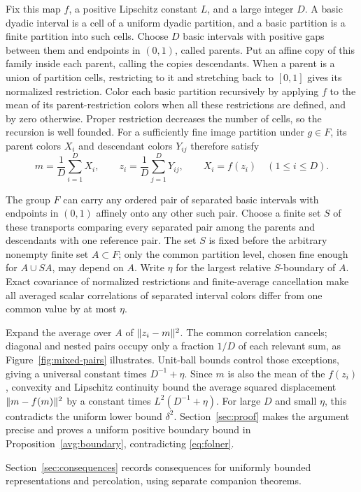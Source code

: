 Fix this map \(f\), a positive Lipschitz constant \(L\), and a large
integer \(D\). A basic dyadic interval is a cell of a uniform dyadic
partition, and a basic partition is a finite partition into such cells.
Choose \(D\) basic intervals with positive gaps between them and endpoints
in \((0,1)\), called parents. Put an affine copy of this family inside
each parent, calling the copies descendants. When a parent is a union
of partition cells, restricting to it and stretching back to \([0,1]\)
gives its normalized restriction. Color each basic partition recursively
by applying \(f\) to the mean of its parent-restriction colors when all
these restrictions are defined, and by zero otherwise. Proper
restriction decreases the number of cells, so the recursion is well
founded. For a sufficiently fine image partition under \(g\in F\), its
parent colors \(X_i\) and descendant colors \(Y_{ij}\) therefore satisfy
\[
 m=\frac1D\sum_{i=1}^D X_i,\qquad
 z_i=\frac1D\sum_{j=1}^D Y_{ij},\qquad
 X_i=f(z_i)\quad(1\le i\le D).
\]

The group \(F\) can carry any ordered pair of separated basic intervals
with endpoints in \((0,1)\) affinely onto any other such pair. Choose a
finite set \(S\) of these transports comparing every separated pair among
the parents and descendants with one reference pair. The set \(S\) is
fixed before the arbitrary nonempty
finite set \(A\subset F\); only the common partition level, chosen fine
enough for \(A\cup SA\), may depend on \(A\). Write \(\eta\) for the
largest relative \(S\)-boundary of \(A\). Exact covariance of normalized
restrictions and finite-average cancellation make all averaged scalar
correlations of separated interval colors differ from one common value
by at most \(\eta\).

Expand the average over \(A\) of \(\lVert z_i-m\rVert^2\). The common
correlation cancels; diagonal and nested pairs occupy only a fraction
\(1/D\) of each relevant sum, as Figure~\ref{fig:mixed-pairs} illustrates.
Unit-ball bounds control those exceptions, giving a universal constant
times \(D^{-1}+\eta\). Since \(m\) is also the mean of the \(f(z_i)\),
convexity and Lipschitz continuity bound the average squared displacement
\(\lVert m-f(m)\rVert^2\) by a constant times \(L^2(D^{-1}+\eta)\).
For large \(D\) and small \(\eta\), this contradicts the uniform lower
bound \(\delta^2\). Section~\ref{sec:proof} makes the argument precise and proves a
uniform positive boundary bound in Proposition~\ref{avg:boundary},
contradicting \eqref{eq:folner}.

Section~\ref{sec:consequences} records consequences for uniformly bounded
representations and percolation, using separate companion theorems.
